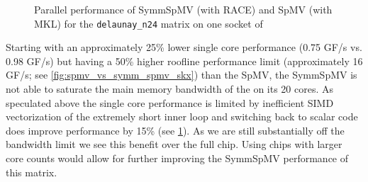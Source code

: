   \begin{figure}[thbp]
  	\centering
  	\caption{Parallel performance  of \acrshort{SymmSpMV} (with \acrshort{RACE})  and \acrshort{SpMV} (with \acrshort{MKL}) for the \texttt{delaunay\_n24} matrix on one socket of \SKX}
  	\label{fig:scaling_delaunay}
  \end{figure}
%
Starting with an approximately 25\% lower single core performance (0.75 GF/s vs. 0.98 GF/s) but having a 50\% higher roofline performance limit (approximately 16 GF/s; see \cref{fig:spmv_vs_symm_spmv_skx}) than the \acrshort{SpMV}, the \acrshort{SymmSpMV} is not able to saturate the main memory bandwidth of the \SKX on its 20 cores. As speculated above the single core performance is limited by inefficient SIMD vectorization of the extremely short inner loop and switching back to scalar code does improve performance by 15\% (see \cref{fig:scaling_delaunay}). As we are still substantially off the bandwidth limit we see this benefit over the full chip. Using chips with larger core counts would allow for further improving the \acrshort{SymmSpMV} performance of this matrix.


